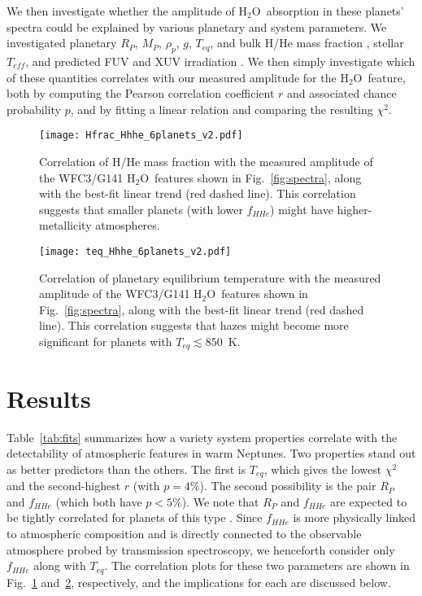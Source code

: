 \documentclass[twocolumn]{aastex61}
\newcommand{\water}{H$_2$O}
\begin{document}
We then investigate whether the amplitude of \water\ absorption in these planets' spectra could be explained by various planetary and system parameters.  We investigated planetary $R_P$, $M_P$, $\rho_p$, $g$, $T_{eq}$, and bulk H/He mass fraction \citep[$f_{HHe}$; from ][]{lopez:2014},   stellar $T_{eff}$, and predicted FUV and XUV irradiation \citep[from ][]{france:2016}. We then simply investigate which of these quantities correlates with our measured amplitude for the \water\ feature, both by computing the Pearson correlation coefficient $r$ and associated chance probability $p$, and  by fitting a linear relation and comparing the resulting $\chi^2$. 

\begin{figure}
\texttt{[image: Hfrac\_Hhhe\_6planets\_v2.pdf]}
\caption{Correlation of H/He mass fraction \citep[$f_{HHe}$, from][]{lopez:2014} with the measured amplitude of the WFC3/G141 \water\ features shown in Fig.~\ref{fig:spectra}, along with the best-fit linear trend (red dashed line).  This correlation suggests that smaller planets (with lower $f_{HHe}$) might have higher-metallicity atmospheres. \label{fig:hfrac}}
\end{figure}



\begin{figure}
\texttt{[image: teq\_Hhhe\_6planets\_v2.pdf]}
\caption{Correlation of planetary equilibrium temperature with the measured amplitude of the WFC3/G141 \water\ features shown in Fig.~\ref{fig:spectra}, along with the best-fit linear trend (red dashed line). This correlation suggests that hazes might become more significant for planets with $T_{eq} \lesssim 850$~K. \label{fig:teq}}
\end{figure}


\section{Results}
\label{sec:results}
Table~\ref{tab:fits} summarizes how a variety system properties
correlate with the detectability of atmospheric features in warm
Neptunes. Two properties stand out as better predictors than the others. The first is $T_{eq}$, which gives the lowest
$\chi^2$ and the second-highest $r$ (with $p=4\%$). The second possibility
is the pair $R_P$ and $f_{HHe}$ (which both have $p<5\%$). We note that $R_P$ and $f_{HHe}$ are expected to be tightly correlated for planets of this type \citep{lopez:2014}. Since $f_{HHe}$ is more physically linked to atmospheric composition and is directly
connected to the observable atmosphere probed by transmission
spectroscopy, we henceforth consider only $f_{HHe}$ along with
$T_{eq}$.  The correlation plots for these two parameters are shown in
Fig.~\ref{fig:hfrac} and~\ref{fig:teq}, respectively, and the
implications for each are discussed below.
\end{document}
